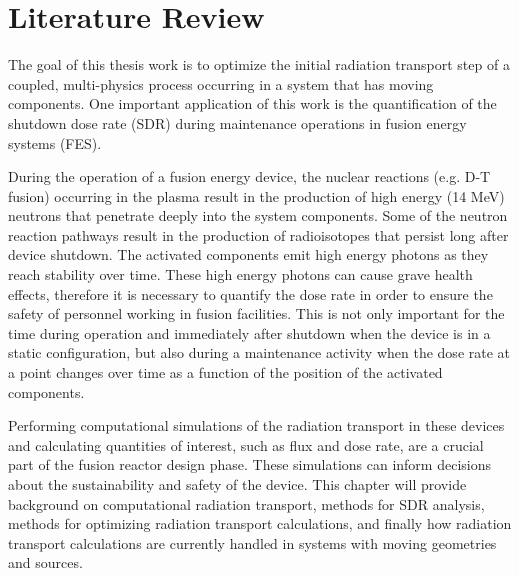 \chapter{Literature Review} \label{ch:litrev}

The goal of this thesis work is to optimize the initial radiation transport step of a
coupled, multi-physics process occurring in a system that has moving components.  One
important application of this work is the quantification of the shutdown dose
rate (SDR) during maintenance operations in fusion energy systems (FES).

During the operation of a fusion energy device, the nuclear reactions (e.g. D-T
fusion) occurring in the plasma result in the production of high energy (14 MeV) neutrons
that penetrate deeply into the system components.  Some of the neutron reaction
pathways result in the production of radioisotopes that persist long after
device shutdown.  The activated components emit high energy photons as they
reach stability over time.  These high energy photons
can cause grave health effects, therefore it is necessary to     
quantify the dose rate in order to ensure the safety of personnel working in
fusion facilities.  This is not only important for the time during operation
and immediately after shutdown when the device is in a static configuration,
but also during a maintenance activity 
when the dose rate at a point changes over
time as a function of the position of the activated components.

Performing computational simulations of the radiation transport in these
devices and calculating quantities of interest, such as flux and dose rate, are
a crucial part of the fusion reactor design phase.  These simulations can
inform decisions about the sustainability and safety of the device.  
This chapter will provide background on computational radiation
transport, methods for SDR analysis, methods for optimizing radiation transport
calculations, and finally  how radiation transport calculations are currently
handled in systems with moving geometries and sources.





